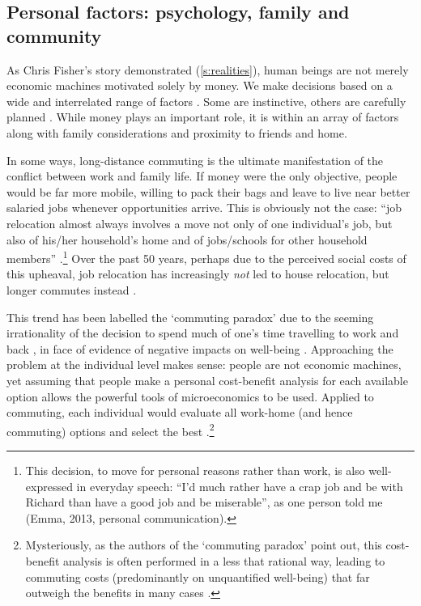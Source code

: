 \documentclass[a4paper, 11pt, twoside]{Thesis}
\begin{document}
\subsection{Personal factors: psychology, family and community}
As Chris Fisher's story demonstrated (\cref{s:realities}), human beings are not
merely economic machines motivated solely by money. We make decisions based on
a wide and interrelated range of factors \citep{Pinker1997}. Some are instinctive, others
are carefully planned \citep{Kahneman2012}. 
While money plays an important role, it is within an array of 
factors along with family considerations and proximity to friends and home.

In some ways, long-distance commuting is the ultimate
manifestation of the conflict between
work and family life. If money were the only objective, people would be far more
mobile, willing to pack their bags and leave to live near better salaried jobs
whenever opportunities arrive. This is obviously not the case:
``job relocation almost always involves a move not only of one
individual's job, but also of his/her household's home and of jobs/schools for other
household members''
\citep[p.~52]{Green-1999-ld-commute}.\footnote{This
decision, to move for personal reasons rather than work,
is also well-expressed in everyday speech:
``I'd much rather
have a crap job and be with Richard than have a good job and be miserable'', as one
person told me (Emma, 2013, personal communication).
}
Over the past 50 years, perhaps due to the perceived social costs
of this upheaval, job relocation has increasingly
\emph{not} led to house relocation, but longer commutes instead
\citep{Green-1999-ld-commute, Nielsen2008}.

This trend has been labelled the `commuting paradox' due to the
seeming irrationality of the decision 
to spend much of one's time travelling to work and back \citep{Stutzer2008},
in face of evidence of negative impacts on well-being \citep{novaco1990objective}.
Approaching the problem at the individual level makes sense:
people are not economic machines,
yet assuming that people make a personal cost-benefit analysis for each
available option allows the powerful tools of microeconomics to be used. Applied to
commuting, each individual would evaluate all work-home (and
hence commuting) options and select the
best \citep{Stutzer2008}.\footnote{Mysteriously,
as the authors of the `commuting paradox' point out, this cost-benefit analysis is often
performed in a less that rational way, leading to commuting costs
(predominantly on unquantified well-being) that far outweigh the benefits
in many cases \citep{Stutzer2008}.
}
\end{document}

